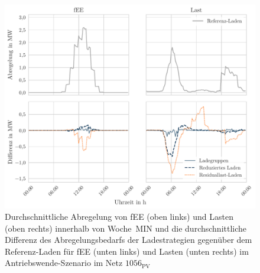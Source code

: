 \begin{figure}[H]
    \centering
    \includegraphics[width=\textwidth]{Bilder/1056_fEE_load_diff}
    \caption[Durchschnittliche Abregelung von fEE und Lasten innerhalb von Woche~MIN und die durchschnittliche Differenz des Abregelungsbedarfs der Ladestrategien gegenüber dem Referenz-Laden für fEE  und Lasten im Antriebswende-Szenario im Netz \num{1056}]{Durchschnittliche Abregelung von fEE (oben links) und Lasten (oben rechts) innerhalb von Woche~MIN und die durchschnittliche Differenz des Abregelungsbedarfs der Ladestrategien gegenüber dem Referenz-Laden für fEE (unten links) und Lasten (unten rechts) im Antriebswende-Szenario im Netz \(1056_{\text{PV}}\)}\label{fig:1056_fEE_load_diff}
\end{figure}